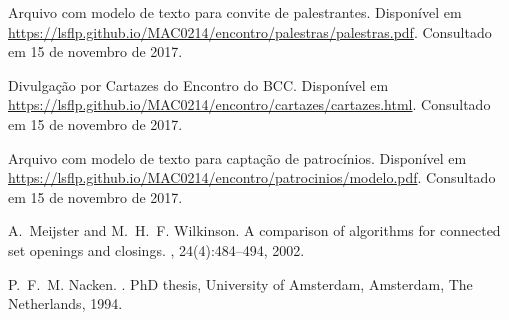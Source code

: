 \documentclass[12pt,letterpaper]{article}
\begin{document}
	\begin{thebibliography}{1}
		
		Arquivo com modelo de texto para convite de palestrantes.
		\newblock Disponível em \url{https://lsflp.github.io/MAC0214/encontro/palestras/palestras.pdf}.
		\newblock Consultado em 15 de novembro de 2017.
		
		Divulgação por Cartazes do Encontro do BCC.
		\newblock Disponível em \url{https://lsflp.github.io/MAC0214/encontro/cartazes/cartazes.html}.
		\newblock Consultado em 15 de novembro de 2017.
		
		Arquivo com modelo de texto para captação de patrocínios.
		\newblock Disponível em \url{https://lsflp.github.io/MAC0214/encontro/patrocinios/modelo.pdf}.
		\newblock Consultado em 15 de novembro de 2017.
		
		A.~Meijster and M.~H.~F. Wilkinson.
		\newblock A comparison of algorithms for connected set openings and closings.
		, 24(4):484--494, 2002.
		
		P.~F.~M. Nacken.
		.
		\newblock PhD thesis, University of Amsterdam, Amsterdam, The Netherlands,
		1994.
		
	\end{thebibliography}
	
			 
\end{document}
